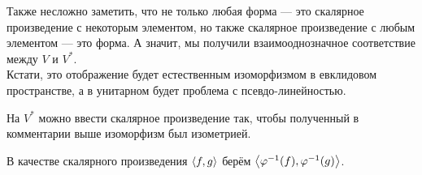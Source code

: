 \documentclass{article}
\begin{document}
\begin{itemize}
        \begin{Comment}
            Также несложно заметить, что не только любая форма --- это скалярное произведение с некоторым элементом, но также скалярное произведение с любым элементом --- это форма. А значит, мы получили взаимооднозначное соответствие между $V$ и $V^*$.\\
            Кстати, это отображение будет естественным изоморфизмом в евклидовом пространстве, а в унитарном будет проблема с псевдо-линейностью.
        \end{Comment}
        \thm На $V^*$ можно ввести скалярное произведение так, чтобы полученный в комментарии выше изоморфизм был изометрией.
        \begin{Proof}
            В качестве скалярного произведения ${\left\langle{f},{g}\right\rangle}$ берём ${\left\langle{\varphi^{-1}(f)},{\varphi^{-1}(g)}\right\rangle}$.
        \end{Proof}
    \end{itemize}
\end{document}
